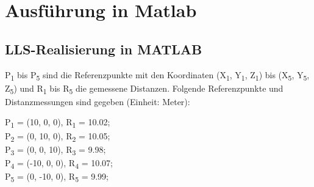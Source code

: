 \section{Ausführung in Matlab}

\subsection{LLS-Realisierung in MATLAB}
P\textsubscript{1} bis P\textsubscript{5} sind die Referenzpunkte mit den Koordinaten (X\textsubscript{1}, Y\textsubscript{1}, Z\textsubscript{1}) bis (X\textsubscript{5}, Y\textsubscript{5}, Z\textsubscript{5}) und R\textsubscript{1} bis R\textsubscript{5} die gemessene Distanzen. Folgende Referenzpunkte und Distanzmessungen sind gegeben (Einheit: Meter):
\begin{flushleft}
	P\textsubscript{1} = (10, 0, 0), R\textsubscript{1} = 10.02;\\
	P\textsubscript{2} = (0, 10, 0), R\textsubscript{2} = 10.05;\\
	P\textsubscript{3} = (0, 0, 10), R\textsubscript{3} = 9.98;\\
	P\textsubscript{4} = (-10, 0, 0), R\textsubscript{4} = 10.07;\\
	P\textsubscript{5} = (0, -10, 0), R\textsubscript{5} = 9.99;
\end{flushleft}

